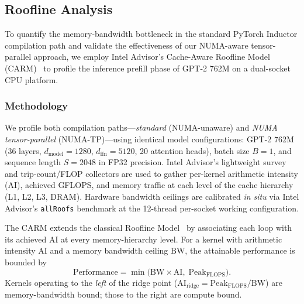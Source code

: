 
\subsection{Roofline Analysis}
\label{subsec:roofline}

To quantify the memory-bandwidth bottleneck in the standard PyTorch Inductor
compilation path and validate the effectiveness of our NUMA-aware tensor-parallel
approach, we employ Intel Advisor's Cache-Aware Roofline Model
(CARM)~\cite{ilic2014cache} to profile the inference prefill phase of GPT-2
762M on a dual-socket CPU platform.

\subsubsection{Methodology}
\label{subsubsec:roofline-methodology}

We profile both compilation paths---\emph{standard} (NUMA-unaware) and
\emph{NUMA tensor-parallel} (NUMA-TP)---using identical model configurations:
GPT-2 762M (36 layers, $d_{\text{model}}{=}1280$, $d_{\text{ffn}}{=}5120$,
20 attention heads), batch size $B{=}1$, and sequence length $S{=}2048$ in
FP32 precision.  Intel Advisor's lightweight survey and trip-count/FLOP
collectors are used to gather per-kernel arithmetic intensity (AI), achieved
GFLOPS, and memory traffic at each level of the cache hierarchy (L1, L2, L3,
DRAM).  Hardware bandwidth ceilings are calibrated \emph{in situ} via
Intel Advisor's \texttt{allRoofs} benchmark at the 12-thread per-socket
working configuration.

The CARM extends the classical Roofline Model~\cite{williams2009roofline} by
associating each loop with its achieved AI at every memory-hierarchy level.
For a kernel with arithmetic intensity $\text{AI}$ and a memory bandwidth
ceiling $\text{BW}$, the attainable performance is bounded by
\begin{equation}
  \text{Performance} = \min\!\bigl(\text{BW} \times \text{AI},\;
  \text{Peak}_{\text{FLOPS}}\bigr).
  \label{eq:roofline}
\end{equation}
Kernels operating to the \emph{left} of the ridge point
($\text{AI}_{\text{ridge}} = \text{Peak}_{\text{FLOPS}} / \text{BW}$) are
memory-bandwidth bound; those to the right are compute bound.

